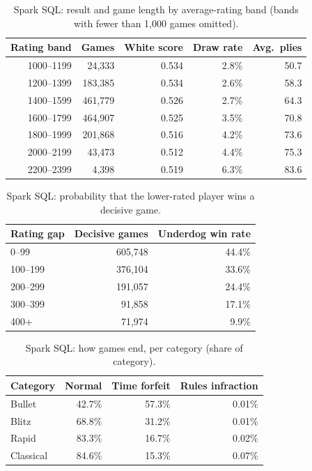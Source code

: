 \documentclass[11pt,a4paper]{article}
\begin{document}
\begin{table}[H]\centering\small
\caption{Spark SQL: result and game length by average-rating band
(bands with fewer than 1,000 games omitted).}
\begin{tabular}{@{}rrrrr@{}}\toprule
Rating band & Games & White score & Draw rate & Avg.\ plies\\\midrule
1000--1199 & 24,333 & 0.534 & 2.8\% & 50.7\\
1200--1399 & 183,385 & 0.534 & 2.6\% & 58.3\\
1400--1599 & 461,779 & 0.526 & 2.7\% & 64.3\\
1600--1799 & 464,907 & 0.525 & 3.5\% & 70.8\\
1800--1999 & 201,868 & 0.516 & 4.2\% & 73.6\\
2000--2199 & 43,473 & 0.512 & 4.4\% & 75.3\\
2200--2399 & 4,398 & 0.519 & 6.3\% & 83.6\\\bottomrule
\end{tabular}\end{table}

\begin{table}[H]\centering\small
\caption{Spark SQL: probability that the lower-rated player wins a decisive game.}
\begin{tabular}{@{}lrr@{}}\toprule
Rating gap & Decisive games & Underdog win rate\\\midrule
0--99 & 605,748 & 44.4\%\\
100--199 & 376,104 & 33.6\%\\
200--299 & 191,057 & 24.4\%\\
300--399 & 91,858 & 17.1\%\\
400+ & 71,974 & 9.9\%\\\bottomrule
\end{tabular}\end{table}

\begin{table}[H]\centering\small
\caption{Spark SQL: how games end, per category (share of category).}
\begin{tabular}{@{}lrrr@{}}\toprule
Category & Normal & Time forfeit & Rules infraction\\\midrule
Bullet & 42.7\% & 57.3\% & 0.01\%\\
Blitz & 68.8\% & 31.2\% & 0.01\%\\
Rapid & 83.3\% & 16.7\% & 0.02\%\\
Classical & 84.6\% & 15.3\% & 0.07\%\\\bottomrule
\end{tabular}\end{table}
\end{document}
